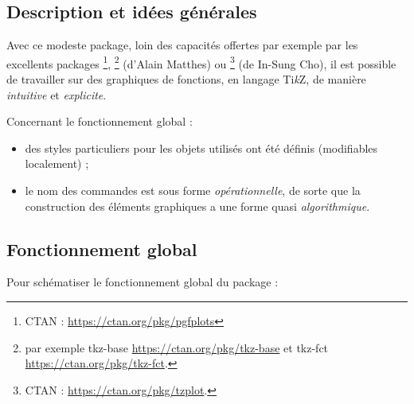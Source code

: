 \documentclass[11pt,a4paper]{ltxdoc}
\providecommand\tikzlogo{Ti\textit{k}Z}
\let\TikZ\tikzlogo
\begin{document}
\subsection{Description et idées générales}

Avec ce modeste package, loin des capacités offertes par exemple par les excellents packages \footnote{CTAN : \url{https://ctan.org/pkg/pgfplots}}, \footnote{par exemple tkz-base \url{https://ctan.org/pkg/tkz-base} et tkz-fct \url{https://ctan.org/pkg/tkz-fct}.} (d'Alain Matthes) ou \footnote{CTAN :  \url{https://ctan.org/pkg/tzplot}.} (de In-Sung Cho), il est possible de travailler sur des graphiques de fonctions, en langage \TikZ, de manière \textit{intuitive} et \textit{explicite}.

\smallskip

Concernant le fonctionnement global :

\smallskip

\begin{itemize}
  \item des styles particuliers pour les objets utilisés ont été définis (modifiables localement) ;
  \item le nom des commandes est sous forme \textit{opérationnelle}, de sorte que la construction des éléments graphiques a une forme quasi \textit{algorithmique}.
\end{itemize}

\subsection{Fonctionnement global}

Pour schématiser le fonctionnement global du package :
\end{document}
